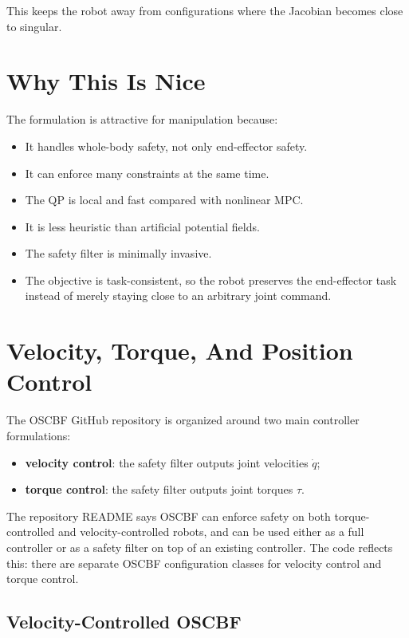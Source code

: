 \documentclass[11pt]{article}
\begin{document}
This keeps the robot away from configurations where the Jacobian becomes close
to singular.

\section{Why This Is Nice}

The formulation is attractive for manipulation because:

\begin{itemize}[leftmargin=*]
    \item It handles whole-body safety, not only end-effector safety.
    \item It can enforce many constraints at the same time.
    \item The QP is local and fast compared with nonlinear MPC.
    \item It is less heuristic than artificial potential fields.
    \item The safety filter is minimally invasive.
    \item The objective is task-consistent, so the robot preserves the
    end-effector task instead of merely staying close to an arbitrary joint
    command.
\end{itemize}

\section{Velocity, Torque, And Position Control}

The OSCBF GitHub repository is organized around two main controller
formulations:

\begin{itemize}[leftmargin=*]
    \item \textbf{velocity control}: the safety filter outputs joint velocities
    $\dot{q}$;
    \item \textbf{torque control}: the safety filter outputs joint torques
    $\tau$.
\end{itemize}

The repository README says OSCBF can enforce safety on both torque-controlled
and velocity-controlled robots, and can be used either as a full controller or
as a safety filter on top of an existing controller. The code reflects this:
there are separate OSCBF configuration classes for velocity control and torque
control.

\subsection{Velocity-Controlled OSCBF}
\end{document}

